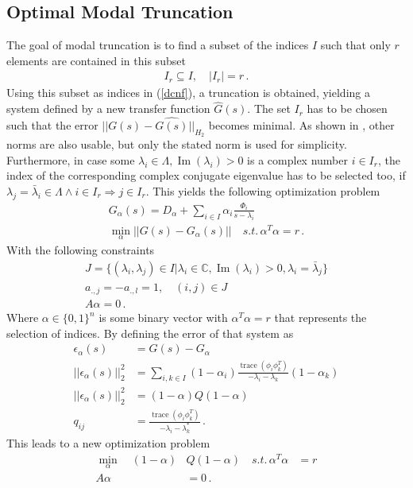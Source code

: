 \subsection{Optimal Modal Truncation}
The goal of modal truncation is to find a subset of the indices \(I\)  such that only \(r\) elements are contained in this subset
\begin{gather}
I_r \subseteq I, \quad |I_r| = r \,.
\end{gather}
Using this subset as indices in (\ref{dcnf}), a truncation is obtained, yielding a system defined by a new transfer function \(\hat{G}(s)\).
The set \(I_r\) has to be chosen such that the error \(||G(s) - \hat{G(s)}||_{H_2}\) becomes minimal.
As shown in \cite{vuillemin2020optimal}, other norms are also usable, but only the stated norm is used for simplicity.
Furthermore, in case some \(\lambda_i \in \Lambda, \operatorname{Im}(\lambda_i) > 0\) is a complex number  \(i \in I_r\), the index of the corresponding complex conjugate eigenvalue has to be selected too, if \(\lambda_j = \bar{\lambda}_i \in \Lambda \wedge i \in I_r \Rightarrow j \in I_r\). 
This yields the following optimization problem
\begin{gather}
G_{\alpha}(s) = D_{\alpha} + \sum_{i \in I} \alpha_i \frac{\Phi_i}{s - \lambda_i} \\ 
\min_{\alpha} ||G(s) - G_{\alpha}(s)|| \quad s.t. \,
\alpha^{T}\alpha = r \,.
\end{gather}
With the following constraints
\begin{gather}
J = \{(\lambda_i, \lambda_j) \in I | \lambda_i \in \mathbb{C}, \operatorname{Im}(\lambda_i) > 0, \lambda_i = \bar{\lambda}_j\} \\
a_{.,j} = -a_{.,l} = 1, \quad	(i, j) \in J \\
A\alpha = 0 \,.
\end{gather}
Where \(\alpha \in \{0, 1\}^{n}\) is some binary vector with \(\alpha^{T} \alpha = r\) that represents the selection of indices.
By defining the error of that system as
\begin{align}
\epsilon_{\alpha}(s) &= G(s) - G_{\alpha} \\
||\epsilon_{\alpha}(s)||_2^2 &= \sum_{i, k \in I} (1-\alpha_i) \frac{\operatorname{trace}(\phi_i \phi_k^{T})}{-\lambda_i - \lambda_k}(1-\alpha_k) \\
||\epsilon_{\alpha}(s)||_2^2 &= (1-\alpha)Q(1-\alpha) \\
q_{ij} &= \frac{\operatorname{trace}(\phi_i \phi_k^{T})}{-\lambda_i - \lambda_k^*} \,.
\end{align} 
This leads to a new optimization problem \cite{vuillemin2020optimal}
\begin{align}
\min_{\alpha} \quad (1-\alpha)&Q(1-\alpha) \label{opt-h2} \quad
s.t. \, \alpha^T\alpha &= r \\
A\alpha &= 0 \,.
\end{align}

